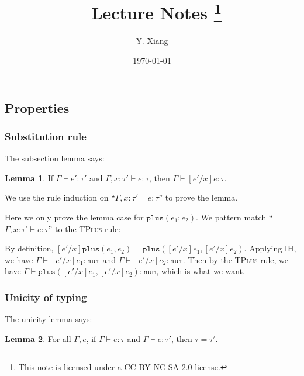 \documentclass{article}
\title{\vspace{-3em}\course\, Lecture Notes \asnum\footnote{This note is licensed under a \href{https://creativecommons.org/licenses/by-nc-sa/2.0/}{CC BY-NC-SA 2.0} license.}}
\author{Y. Xiang\vspace{1em}}
\date{\today\vspace{-1em}}
\theoremstyle{definition}
\newtheorem{lemma}{Lemma}[section]
\begin{document}
\maketitle

\subsection{Properties}

\subsubsection*{Substitution rule}

The subsection lemma says:
\begin{lemma}
    If $\Gamma \vdash e':\tau'$ and $\Gamma, x:\tau'\vdash e:\tau$, then $\Gamma \vdash [e'/x]e:\tau$.
\end{lemma}

We use the rule induction on ``$\Gamma, x:\tau'\vdash e:\tau$'' to prove the lemma.

Here we only prove the lemma case for $\mathtt{plus}(e_1;e_2)$.
We pattern match ``$\Gamma, x:\tau'\vdash e:\tau$'' to the \textsc{TPlus} rule:
\begin{mathpar}
\end{mathpar}

By definition, $[e'/x]\mathtt{plus}(e_1,e_2) = \mathtt{plus}([e'/x]e_1, [e'/x]e_2)$. Applying IH, we have $\Gamma \vdash [e'/x]e_1:\mathtt{num}$ and $\Gamma \vdash [e'/x]e_2:\mathtt{num}$. Then by the \textsc{TPlus} rule, we have $\Gamma \vdash \mathtt{plus}([e'/x]e_1, [e'/x]e_2):\mathtt{num}$, which is what we want.

\subsubsection*{Unicity of typing}

The unicity lemma says:
\begin{lemma}
    For all $\Gamma, e$, if $\Gamma \vdash e: \tau$ and $\Gamma \vdash e: \tau'$, then $\tau = \tau'$.
\end{lemma}
\end{document}
